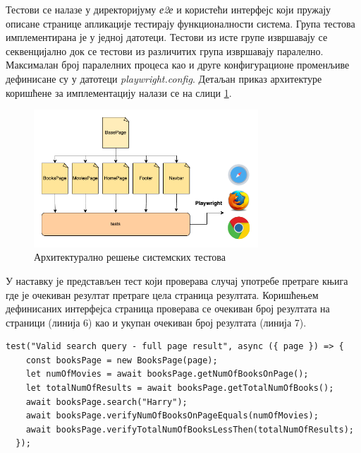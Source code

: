 \documentclass[12pt,oneside]{memoir}
\begin{document}
Тестови се налазе у директоријуму \textit{е2е} и користећи интерфејс који пружају описане странице апликације тестирају функционалности система. Група тестова имплементирана је у једној датотеци. Тестови из исте групе извршавају се секвенцијално док се тестови из различитих група извршавају паралелно. Максималан број паралелних процеса као и друге конфигурационе променљиве дефинисане су у датотеци \textit{playwright.config}. Детаљан приказ архитектуре коришћене за имплементацију налази се на слици \ref{fig:arhitektura}.

\begin{figure}[!ht]
  \centering
  \includegraphics[width=0.75\textwidth]{matfmaster/img/arhitektura.png}
  \caption{Архитектурално решење системских тестова}
  \label{fig:arhitektura}
\end{figure}

У наставку је представљен тест који проверава случај употребе претраге књига где је очекиван резултат претраге цела страница резултата. Коришћењем дефинисаних интерфејса страница проверава се очекиван број резултата на страници (линија 6) као и укупан очекиван број резултата (линија 7).


\begin{lstlisting}[caption=Тест случаја употребе --- претрага књига, 
label={lst:pretragaKnjiga},
frame=single]
 test("Valid search query - full page result", async ({ page }) => {
    const booksPage = new BooksPage(page);
    let numOfMovies = await booksPage.getNumOfBooksOnPage();
    let totalNumOfResults = await booksPage.getTotalNumOfBooks();
    await booksPage.search("Harry");
    await booksPage.verifyNumOfBooksOnPageEquals(numOfMovies);
    await booksPage.verifyTotalNumOfBooksLessThen(totalNumOfResults);
  });
\end{lstlisting}
\end{document}
